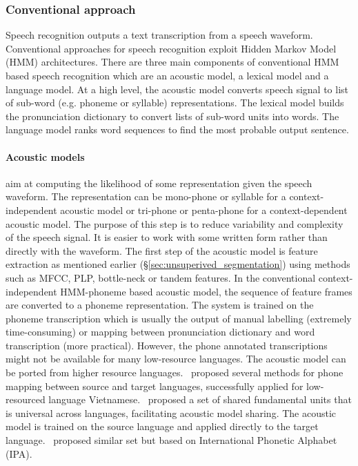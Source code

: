 \documentclass[12pt,twoside,final,hidelinks]{ltthesis}
\theoremstyle{definition}
\begin{document}
\subsubsection{Conventional approach}
Speech recognition outputs a text transcription from a speech waveform. Conventional approaches for speech recognition exploit Hidden Markov Model (HMM) architectures. 
There are three main components of conventional HMM based speech recognition which are an acoustic model, a lexical model and a language model. At a high level, the acoustic model converts speech signal to list of sub-word (e.g. phoneme or syllable) representations. The lexical model builds the pronunciation dictionary to convert lists of sub-word units into words. The language model ranks word sequences to find the most probable output sentence. 

\paragraph{Acoustic models} aim at computing the likelihood of some representation given the speech waveform. The representation can be mono-phone or syllable for a context-independent 
acoustic model or tri-phone or penta-phone for a context-dependent acoustic model. The purpose of this step is to reduce variability and complexity of the speech signal. 
It is easier to work with some written form rather than directly with the waveform. The first step of the acoustic model is feature extraction as mentioned earlier (\S\ref{sec:unsuperived_segmentation})
using methods such as MFCC, PLP, bottle-neck or tandem features. In the conventional context-independent HMM-phoneme based acoustic model, the sequence of feature 
frames are converted to a phoneme representation. The system is trained on the phoneme transcription which is usually the 
output of manual labelling (extremely time-consuming) or mapping between pronunciation dictionary and word transcription (more practical). However, the phone annotated 
transcriptions might not be available for many low-resource languages. The acoustic model can be ported from higher resource languages.~ 
proposed several methods for phone mapping between source and target languages, successfully applied for low-resourced language 
Vietnamese.~ proposed a set of shared fundamental units that is universal across languages, facilitating  acoustic model 
sharing. The acoustic model is trained on the source language and applied directly to the target language.~ proposed similar set but based on International Phonetic Alphabet (IPA).  %
\end{document}
